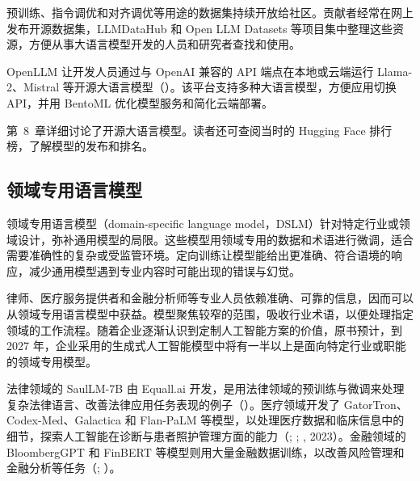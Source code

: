 预训练、指令调优和对齐调优等用途的数据集持续开放给社区。贡献者经常在网上发布开源数据集，LLMDataHub 和 Open LLM Datasets 等项目集中整理这些资源，方便从事大语言模型开发的人员和研究者查找和使用。

OpenLLM 让开发人员通过与 OpenAI 兼容的 API 端点在本地或云端运行 Llama-2、Mistral 等开源大语言模型（）。该平台支持多种大语言模型，方便应用切换 API，并用 BentoML 优化模型服务和简化云端部署。

第~8~章详细讨论了开源大语言模型。读者还可查阅当时的 Hugging Face 排行榜，了解模型的发布和排名。

\subsection{领域专用语言模型}
领域专用语言模型（domain-specific language model，DSLM）针对特定行业或领域设计，弥补通用模型的局限。这些模型用领域专用的数据和术语进行微调，适合需要准确性的复杂或受监管环境。定向训练让模型能给出更准确、符合语境的响应，减少通用模型遇到专业内容时可能出现的错误与幻觉。

律师、医疗服务提供者和金融分析师等专业人员依赖准确、可靠的信息，因而可以从领域专用语言模型中获益。模型聚焦较窄的范围，吸收行业术语，以便处理指定领域的工作流程。随着企业逐渐认识到定制人工智能方案的价值，原书预计，到 2027 年，企业采用的生成式人工智能模型中将有一半以上是面向特定行业或职能的领域专用模型。

法律领域的 SaulLM-7B 由 Equall.ai 开发，是用法律领域的预训练与微调来处理复杂法律语言、改善法律应用任务表现的例子（）。医疗领域开发了 GatorTron、Codex-Med、Galactica 和 Flan-PaLM 等模型，以处理医疗数据和临床信息中的细节，探索人工智能在诊断与患者照护管理方面的能力（; ; , 2023）。金融领域的 BloombergGPT 和 FinBERT 等模型则用大量金融数据训练，以改善风险管理和金融分析等任务（; ）。



